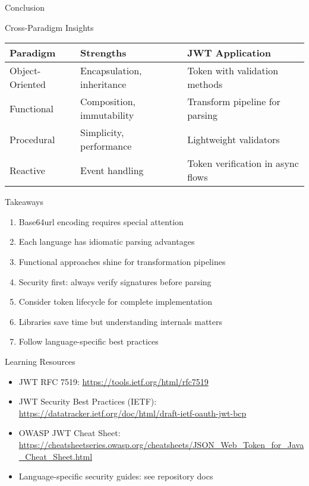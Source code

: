 \documentclass[presentation,aspectratio=169]{beamer}
\begin{document}
\begin{frame}[label={sec:orgab55db2},fragile]{Conclusion}
 \begin{block}{Cross-Paradigm Insights}
\begin{center}
\begin{tabular}{lll}
Paradigm & Strengths & JWT Application\\
\hline
Object-Oriented & Encapsulation, inheritance & Token with validation methods\\
Functional & Composition, immutability & Transform pipeline for parsing\\
Procedural & Simplicity, performance & Lightweight validators\\
Reactive & Event handling & Token verification in async flows\\
\end{tabular}
\end{center}
\end{block}
\begin{block}{Takeaways}
\begin{enumerate}[<+->]
\item Base64url encoding requires special attention
\item Each language has idiomatic parsing advantages
\item Functional approaches shine for transformation pipelines
\item Security first: always verify signatures before parsing
\item Consider token lifecycle for complete implementation
\item Libraries save time but understanding internals matters
\item Follow language-specific best practices
\end{enumerate}
\end{block}
\begin{block}{Learning Resources}
\begin{itemize}[<+->]
\item JWT RFC 7519: \url{https://tools.ietf.org/html/rfc7519}
\item JWT Security Best Practices (IETF): \url{https://datatracker.ietf.org/doc/html/draft-ietf-oauth-jwt-bcp}
\item OWASP JWT Cheat Sheet: \url{https://cheatsheetseries.owasp.org/cheatsheets/JSON\_Web\_Token\_for\_Java\_Cheat\_Sheet.html}
\item Language-specific security guides: see repository docs
\end{itemize}

\end{block}
\end{frame}
\end{document}
